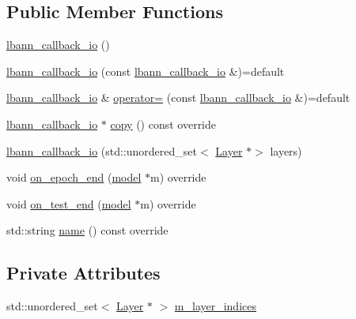 \subsection*{Public Member Functions}
\begin{DoxyCompactItemize}
\item 
\hyperlink{classlbann_1_1lbann__callback__io_a12c89d246c657ca588d3fb637ef79183}{lbann\+\_\+callback\+\_\+io} ()
\item 
\hyperlink{classlbann_1_1lbann__callback__io_adb2d632c4eeb5585d9b8c7535bd35227}{lbann\+\_\+callback\+\_\+io} (const \hyperlink{classlbann_1_1lbann__callback__io}{lbann\+\_\+callback\+\_\+io} \&)=default
\item 
\hyperlink{classlbann_1_1lbann__callback__io}{lbann\+\_\+callback\+\_\+io} \& \hyperlink{classlbann_1_1lbann__callback__io_aaf50b99e51a2ac42a987c7354e52c1e7}{operator=} (const \hyperlink{classlbann_1_1lbann__callback__io}{lbann\+\_\+callback\+\_\+io} \&)=default
\item 
\hyperlink{classlbann_1_1lbann__callback__io}{lbann\+\_\+callback\+\_\+io} $\ast$ \hyperlink{classlbann_1_1lbann__callback__io_aec8c75427c424999d01a18a9fb8e0b0d}{copy} () const override
\item 
\hyperlink{classlbann_1_1lbann__callback__io_a6d19611c89d1cb1bb83f5e4b7a9d5a45}{lbann\+\_\+callback\+\_\+io} (std\+::unordered\+\_\+set$<$ \hyperlink{classlbann_1_1Layer}{Layer} $\ast$$>$ layers)
\item 
void \hyperlink{classlbann_1_1lbann__callback__io_a118c5cb8a9c83661a67569df890676e2}{on\+\_\+epoch\+\_\+end} (\hyperlink{classlbann_1_1model}{model} $\ast$m) override
\item 
void \hyperlink{classlbann_1_1lbann__callback__io_a8abca84e4b0dc21b28e5d5e409446fdc}{on\+\_\+test\+\_\+end} (\hyperlink{classlbann_1_1model}{model} $\ast$m) override
\item 
std\+::string \hyperlink{classlbann_1_1lbann__callback__io_ac0b1327364b2ae3c7b7e4987aef70e33}{name} () const override
\end{DoxyCompactItemize}
\subsection*{Private Attributes}
\begin{DoxyCompactItemize}
\item 
std\+::unordered\+\_\+set$<$ \hyperlink{classlbann_1_1Layer}{Layer} $\ast$ $>$ \hyperlink{classlbann_1_1lbann__callback__io_ab2105f5ed94c9c053b2873ea3a87bc21}{m\+\_\+layer\+\_\+indices}
\end{DoxyCompactItemize}

